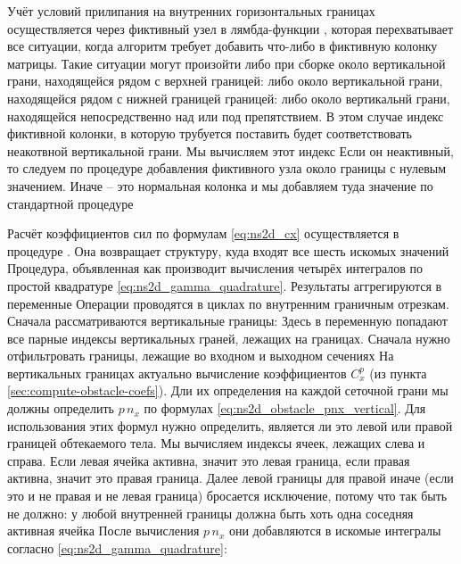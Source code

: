 Учёт условий прилипания на внутренних горизонтальных
границах осуществляется через фиктивный узел в лямбда-функции ,
которая перехватывает все ситуации, когда алгоритм требует добавить что-либо в фиктивную колонку матрицы.
Такие ситуации могут произойти либо при сборке
около вертикальной грани, находящейся рядом с верхней границей:
либо около вертикальной грани, находящейся рядом с нижней границей границей:
либо около вертикальнй грани, находящейся непосредственно над или под препятствием.
В этом случае индекс фиктивной колонки, в которую трубуется поставить будет
соответствовать неакотвной вертикальной грани.
Мы вычисляем этот индекс
Если он неактивный, то следуем по процедуре добавления фиктивного узла около
границы с нулевым значением.
Иначе -- это нормальная колонка и мы добавляем туда значение по стандартной процедуре

\label{sec:prog-cxcy}
Расчёт коэффициентов сил по формулам \cref{eq:ns2d_cx} осуществляется в процедуре .
Она возвращает структуру, куда входят все шесть искомых значений
Процедура, объявленная как
производит вычисления четырёх интегралов по простой квадратуре
\cref{eq:ns2d_gamma_quadrature}.
Результаты аггрегируются в переменные
Операции проводятся в циклах по внутренним граничным отрезкам.
Сначала рассматриваются вертикальные границы:
Здесь в переменную  попадают все парные индексы вертикальных граней, лежащих
на границах. Сначала нужно отфильтровать границы, лежащие во входном и выходном сечениях
На вертикальных границах актуально вычисление коэффициентов $C^p_x$ (из пункта \ref{sec:compute-obstacle-coefs}).
Дли их определения на каждой сеточной грани мы должны определить
$p\,n_x$ по формулах \cref{eq:ns2d_obstacle_pnx_vertical}.
Для использования этих формул нужно определить, является ли это левой или правой границей обтекаемого тела.
Мы вычисляем индексы ячеек, лежащих слева и справа.
Если левая ячейка активна, значит это левая граница, если правая активна, значит это правая граница.
Далее левой границы
для правой
иначе (если это и не правая и не левая граница) бросается исключение,
потому что так быть не должно: у любой внутренней границы должна быть хоть одна соседняя активная ячейка
После вычисления $p\,n_x$ они добавляются
в искомые интегралы согласно
\cref{eq:ns2d_gamma_quadrature}:

